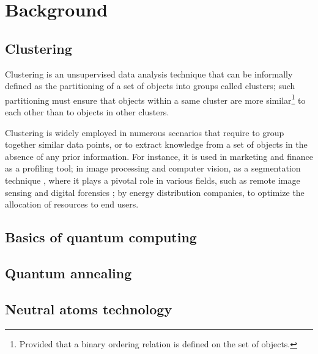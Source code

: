 \chapter{Background}
\label{cha:background}

\section{Clustering}
Clustering is an unsupervised data analysis technique that can be informally defined as the partitioning of a set of objects into groups called clusters; such partitioning must ensure that objects within a same cluster are more similar\footnote{Provided that a binary ordering relation is defined on the set of objects.} to each other than to objects in other clusters. \cite{clustering}

Clustering is widely employed in numerous scenarios that require to group together similar data points, or to extract knowledge from a set of objects in the absence of any prior information. For instance, it is used in marketing and finance as a profiling tool; %
in image processing and computer vision, as a segmentation technique \cite{Gonzalez2017}, where it plays a pivotal role in various fields, such as remote image sensing \cite{remote-sensing} and digital forensics \cite{forensics}; %
by energy distribution companies, to optimize the allocation of resources to end users. %

\section{Basics of quantum computing}

\section{Quantum annealing}

\section{Neutral atoms technology}